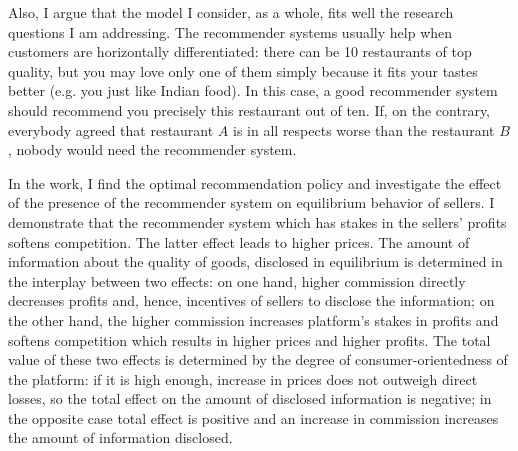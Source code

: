 \documentclass[a4paper]{article}
\begin{document}
	
	
	Also, I argue that the model I consider, as a whole, fits well the research questions I am addressing. The recommender systems usually help when customers are horizontally differentiated: there can be 10 restaurants of top quality, but you may love only one of them simply because it fits your tastes better (e.g. you just like Indian food). In this case, a good recommender system should recommend you precisely this restaurant out of ten. If, on the contrary, everybody agreed that restaurant $A$ is in all respects worse than the restaurant $B$, nobody would need the recommender system.
	
	
	
	
In the work, I find the optimal recommendation policy and investigate the effect of the presence of the recommender system on equilibrium behavior of sellers. I demonstrate that the recommender system which has stakes in the sellers' profits softens competition. The latter effect leads to higher prices. The amount of information about the quality of goods, disclosed in equilibrium is determined in the interplay between two effects: on one hand, higher commission directly decreases profits and, hence, incentives of sellers to disclose the information; on the other hand, the higher commission increases platform's stakes in profits and softens competition which results in higher prices and higher profits. The total value of these two effects is determined by the degree of consumer-orientedness of the platform: if it is high enough, increase in prices does not outweigh direct losses, so the total effect on the amount of disclosed information is negative; in the opposite case total effect is positive and an increase in commission increases the amount of information disclosed.
	
	
	
\end{document}
